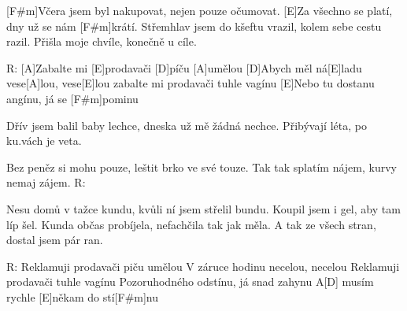  
[F#m]Včera jsem byl nakupovat, nejen pouze očumovat.
[E]Za všechno se platí, dny už se nám [F#m]krátí. 
Střemhlav jsem do kšeftu vrazil, kolem sebe cestu razil.
Přišla moje chvíle, konečně u cíle.

R: [A]Zabalte mi [E]prodavači [D]píču [A]umělou
[D]Abych měl ná[E]ladu vese[A]lou, vese[E]lou
zabalte mi prodavači tuhle vagínu
[E]Nebo tu dostanu angínu, já se [F#m]pominu

Dřív jsem balil baby lechce, dneska už mě žádná nechce.
Přibývají léta, po ku.vách je veta.

Bez peněz si mohu pouze, leštit brko ve své touze.
Tak tak splatím nájem, kurvy nemaj zájem.
R: 

Nesu domů v tažce kundu, kvůli ní jsem střelil bundu.
Koupil jsem i gel, aby tam líp šel.
Kunda občas probíjela, nefachčila tak jak měla.
A tak ze všech stran, dostal jsem pár ran.

R: Reklamuji prodavači piču umělou
V záruce hodinu necelou, necelou
Reklamuji prodavači tuhle vagínu
Pozoruhodného odstínu, já snad zahynu
A[D] musím rychle [E]někam do stí[F#m]nu
